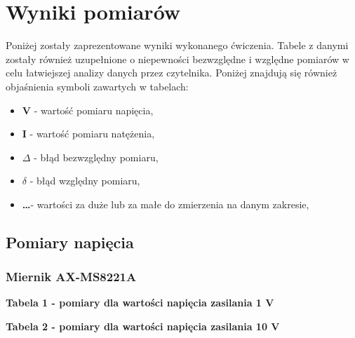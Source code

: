 \documentclass[11pt]{article}
\begin{document}
    \section{Wyniki pomiarów}
    \par{
        Poniżej zostały zaprezentowane wyniki wykonanego ćwiczenia.
        Tabele z danymi zostały również uzupełnione o niepewności bezwzględne i względne pomiarów w celu łatwiejszej analizy danych przez czytelnika.
        Poniżej znajdują się również objaśnienia symboli zawartych w tabelach:
    }
    \begin{itemize}
        \setlength\itemsep{0em}
        \item \textbf{V} - wartość pomiaru napięcia,
        \item \textbf{I} - wartość pomiaru natężenia,
        \item \boldmath$\Delta$ - błąd bezwzględny pomiaru,
        \item \boldmath$\delta$ - błąd względny pomiaru,
        \item \textbf\dots - wartości za duże lub za małe do zmierzenia na danym zakresie,
    \end{itemize}

    \subsection{Pomiary napięcia}
    \subsubsection*{Miernik AX-MS8221A}
    \begin{center}
        \small{\textbf{Tabela 1 - pomiary dla wartości napięcia zasilania 1 V}}
    \end{center}
    \begin{center}
    \end{center}
    \begin{center}
        \small{\textbf{Tabela 2 - pomiary dla wartości napięcia zasilania 10 V}}
    \end{center}
    \begin{center}
    \end{center}
    
\end{document}

